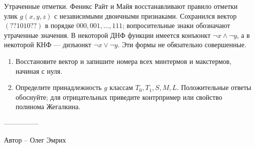 \question
Утраченные отметки. Феникс Райт и Майя восстанавливают правило отметки улик $g(x,y,z)$ с независимыми двоичными признаками. Сохранился вектор $(??1010??)$ в порядке $000,001,\ldots,111$; вопросительные знаки обозначают утраченные значения. В некоторой ДНФ функции имеется конъюнкт $\neg x\land\neg y$, а в некоторой КНФ --- дизъюнкт $\neg x\lor\neg y$. Эти формы не обязательно совершенные.
\begin{enumerate}
\item Восстановите вектор и запишите номера всех минтермов и макстермов, начиная с нуля.
\item Определите принадлежность $g$ классам $T_0,T_1,S,M,L$. Положительные ответы обоснуйте; для отрицательных приведите контрпример или свойство полинома Жегалкина.
\end{enumerate}

---------------

Автор -- Олег Эмрих

